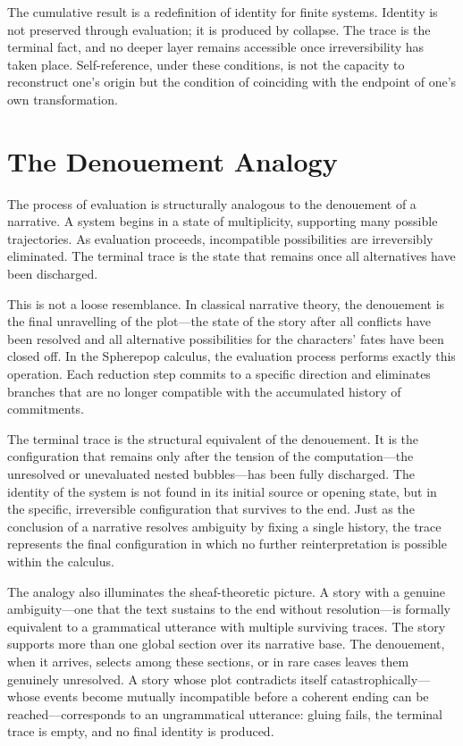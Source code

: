 \documentclass[12pt, oneside]{amsbook}
\theoremstyle{plain}
\theoremstyle{definition}
\theoremstyle{remark}
\begin{document}
The cumulative result is a redefinition of identity for finite systems. Identity
is not preserved through evaluation; it is produced by collapse. The trace is
the terminal fact, and no deeper layer remains accessible once irreversibility
has taken place. Self-reference, under these conditions, is not the capacity to
reconstruct one's origin but the condition of coinciding with the endpoint of
one's own transformation.

\section{The Denouement Analogy}

The process of evaluation is structurally analogous to the denouement of a
narrative. A system begins in a state of multiplicity, supporting many possible
trajectories. As evaluation proceeds, incompatible possibilities are
irreversibly eliminated. The terminal trace is the state that remains once all
alternatives have been discharged.

This is not a loose resemblance. In classical narrative theory, the denouement
is the final unravelling of the plot---the state of the story after all
conflicts have been resolved and all alternative possibilities for the characters'
fates have been closed off. In the Spherepop calculus, the evaluation process
performs exactly this operation. Each reduction step commits to a specific
direction and eliminates branches that are no longer compatible with the
accumulated history of commitments.

The terminal trace is the structural equivalent of the denouement. It is the
configuration that remains only after the tension of the computation---the
unresolved or unevaluated nested bubbles---has been fully discharged. The
identity of the system is not found in its initial source or opening state,
but in the specific, irreversible configuration that survives to the end. Just
as the conclusion of a narrative resolves ambiguity by fixing a single history,
the trace represents the final configuration in which no further reinterpretation
is possible within the calculus.

The analogy also illuminates the sheaf-theoretic picture. A story with a
genuine ambiguity---one that the text sustains to the end without resolution---is
formally equivalent to a grammatical utterance with multiple surviving traces.
The story supports more than one global section over its narrative base. The
denouement, when it arrives, selects among these sections, or in rare cases
leaves them genuinely unresolved. A story whose plot contradicts itself
catastrophically---whose events become mutually incompatible before a coherent
ending can be reached---corresponds to an ungrammatical utterance: gluing fails,
the terminal trace is empty, and no final identity is produced.
\end{document}
